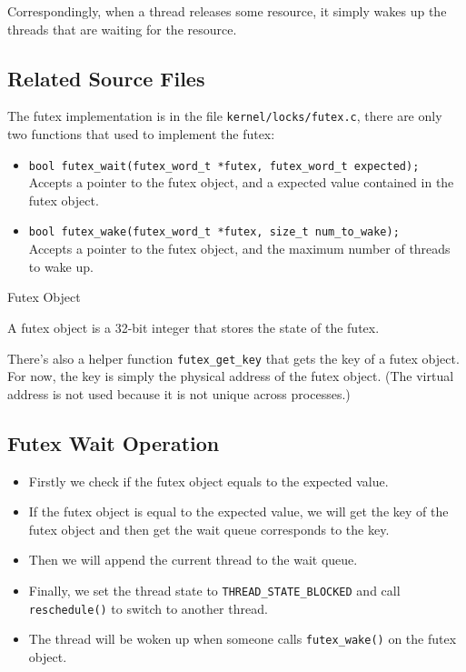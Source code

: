 Correspondingly, when a thread releases some resource, it simply wakes up the threads
that are waiting for the resource.

\subsection{Related Source Files}

The futex implementation is in the file \texttt{kernel/locks/futex.c}, there are only
two functions that used to implement the futex:

\begin{itemize}
    \item \texttt{bool futex\_wait(futex\_word\_t *futex, futex\_word\_t expected);} \\
          Accepts a pointer to the futex object, and a expected value contained in the
          futex object.
    \item \texttt{bool futex\_wake(futex\_word\_t *futex, size\_t num\_to\_wake);} \\
          Accepts a pointer to the futex object, and the maximum number of threads to
          wake up.
\end{itemize}

\begin{note*}{Futex Object}
    \item A futex object is a 32-bit integer that stores the state of the futex.
\end{note*}

There's also a helper function \texttt{futex\_get\_key} that gets the key of a futex object.
For now, the key is simply the physical address of the futex object. (The virtual address
is not used because it is not unique across processes.)

\subsection{Futex Wait Operation}

\begin{itemize}
    \item Firstly we check if the futex object equals to the expected value.
    \item If the futex object is equal to the expected value, we will get the key of
          the futex object and then get the wait queue corresponds to the key.
    \item Then we will append the current thread to the wait queue.
    \item Finally, we set the thread state to \texttt{THREAD\_STATE\_BLOCKED} and call
          \texttt{reschedule()} to switch to another thread.
    \item The thread will be woken up when someone calls \texttt{futex\_wake()} on
          the futex object.
\end{itemize}

